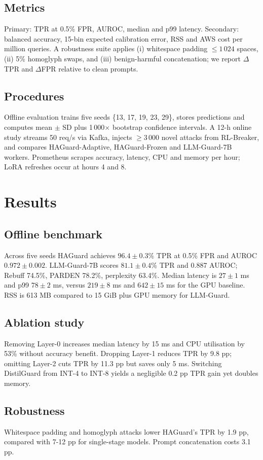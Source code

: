 \documentclass{article}
\begin{document}
\subsection{Metrics}
Primary: TPR at 0.5\% FPR, AUROC, median and p99 latency. Secondary: balanced accuracy, 15-bin expected calibration error, RSS and AWS cost per million queries. A robustness suite applies (i) whitespace padding $\leq 1\,024$ spaces, (ii) 5\% homoglyph swaps, and (iii) benign-harmful concatenation; we report $\Delta$TPR and $\Delta$FPR relative to clean prompts.

\subsection{Procedures}
Offline evaluation trains five seeds \{13, 17, 19, 23, 29\}, stores predictions and computes mean $\pm$ SD plus 1\,000$\times$ bootstrap confidence intervals. A 12-h online study streams 50 req/s via Kafka, injects $\geq 3\,000$ novel attacks from RL-Breaker, and compares HAGuard-Adaptive, HAGuard-Frozen and LLM-Guard-7B workers. Prometheus scrapes accuracy, latency, CPU and memory per hour; LoRA refreshes occur at hours 4 and 8.

\section{Results}
\subsection{Offline benchmark}
Across five seeds HAGuard achieves $96.4 \pm 0.3$\% TPR at 0.5\% FPR and AUROC $0.972 \pm 0.002$. LLM-Guard-7B scores $81.1 \pm 0.4$\% TPR and 0.887 AUROC; Rebuff 74.5\%, PARDEN 78.2\%, perplexity 63.4\%. Median latency is $27 \pm 1$ ms and p99 $78 \pm 2$ ms, versus $219 \pm 8$ ms and $642 \pm 15$ ms for the GPU baseline. RSS is 613 MB compared to 15 GiB plus GPU memory for LLM-Guard.

\subsection{Ablation study}
Removing Layer-0 increases median latency by 15 ms and CPU utilisation by 53\% without accuracy benefit. Dropping Layer-1 reduces TPR by 9.8 pp; omitting Layer-2 cuts TPR by 11.3 pp but saves only 5 ms. Switching DistilGuard from INT-4 to INT-8 yields a negligible 0.2 pp TPR gain yet doubles memory.

\subsection{Robustness}
Whitespace padding and homoglyph attacks lower HAGuard's TPR by 1.9 pp, compared with 7-12 pp for single-stage models. Prompt concatenation costs 3.1 pp.
\end{document}

